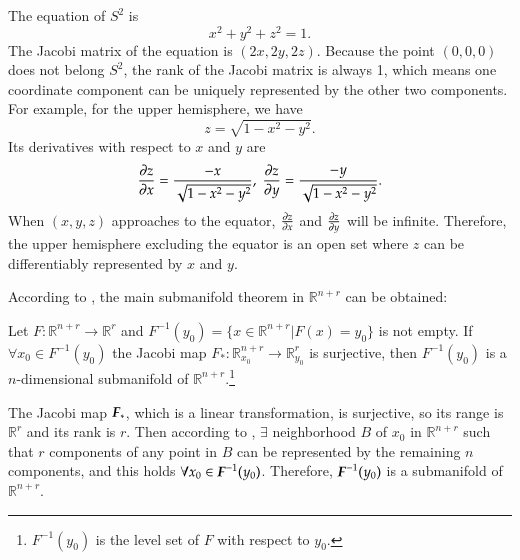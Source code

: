 \documentclass[11pt, a4paper]{book}
\begin{document}
\begin{Example}
  The equation of $S^2$ is
  \begin{equation*}
    x^2 + y^2 + z^2 = 1.
  \end{equation*}
  The Jacobi matrix of the equation is $(2x, 2y, 2z)$. Because the point $(0,0,0)$ does
  not belong $S^2$, the rank of the Jacobi matrix is always 1, which means one coordinate
  component can be uniquely represented by the other two components. For example, for the
  upper hemisphere, we have
  \begin{equation*}
    z = \sqrt{1 - x^2 - y^2}.
  \end{equation*}
  Its derivatives with respect to $x$ and $y$ are
  \begin{equation*}
    \frac{\partial z}{\partial x} = \frac{-x}{\sqrt{1 - x^2 - y^2}}, \; \frac{\partial z}{\partial
      y} = \frac{-y}{\sqrt{1 - x^2 - y^2}}.
  \end{equation*}
  When $(x,y,z)$ approaches to the equator, $\frac{\partial z}{\partial x}$ and
  $\frac{\partial z}{\partial y}$ will be infinite. Therefore, the upper hemisphere excluding
  the equator is an open set where $z$ can be differentiably represented by $x$ and $y$.
\end{Example}

According to , the main submanifold
theorem in $\mathbb{R}^{n+r}$ can be obtained:

\begin{Theorem}
  Let $F: \mathbb{R}^{n+r} \rightarrow \mathbb{R}^r$ and
  $F^{-1}(y_0) = \{x \in \mathbb{R}^{n+r} \vert F(x) = y_0\}$ is not empty. If
  $\forall x_0 \in F^{-1}(y_0)$ the Jacobi map
  $F_{*}: \mathbb{R}_{x_0}^{n+r} \rightarrow \mathbb{R}_{y_0}^r$ is surjective, then
  $F^{-1}(y_0)$ is a $n$-dimensional submanifold of
  $\mathbb{R}^{n+r}$.\footnote{$F^{-1}(y_0)$ is the level set of $F$ with respect to
    $y_0$.}
\end{Theorem}

\begin{Proof}
  The Jacobi map $\boldsymbol{F}_{*}$, which is a linear transformation, is
  surjective, so its range is $\mathbb{R}^r$ and its rank is $r$.
  Then according to ,
  $\exists$ neighborhood $B$ of $x_0$ in $\mathbb{R}^{n+r}$ such that
  $r$ components of any point in $B$ can be represented by the
  remaining $n$ components, and this holds
  $\forall x_0 \in \boldsymbol{F}^{-1}(y_0)$. Therefore,
  $\boldsymbol{F}^{-1}(y_0)$ is a submanifold of $\mathbb{R}^{n+r}$.
\end{Proof}
\end{document}
